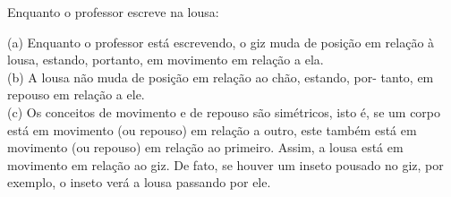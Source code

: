 
\question [\questaopt] Enquanto o professor escreve na lousa:



	\begin{solution}
		
	(a) Enquanto o professor está escrevendo, o giz muda de posição em
	relação à lousa, estando, portanto, em movimento em relação a
	ela.\\
	(b) A lousa não muda de posição em relação ao chão, estando, por-
	tanto, em repouso em relação a ele.\\
	(c) Os conceitos de movimento e de repouso são simétricos, isto é, se
	um corpo está em movimento (ou repouso) em relação a outro,
	este também está em movimento (ou repouso) em relação ao primeiro. Assim, a lousa está em movimento em relação ao giz. De
	fato, se houver um inseto pousado no giz, por exemplo, o inseto
	verá a lousa passando por ele.
		
	\end{solution}

